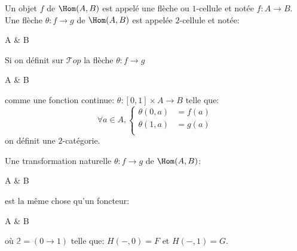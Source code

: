 \documentclass[math, info]{cours}
\begin{document}
\begin{definition}
\begin{enumerate}
	\end{enumerate}
	Un objet $f$ de $\Hom(A, B)$ est appelé une flèche ou $1$-cellule et notée $f: A\to B$.
	Une flèche $\theta : f\to g$ de $\Hom(A, B)$ est appelée $2$-cellule et notée:
	\begin{category}[]
		A\ar[r, "f" name=A, bend left]\ar[r, "g"' name=B, bend right] & B
	\end{category}
	\label{def:2categorie}
\end{definition}

\begin{exemple} Si on définit sur $\mathcal{T}op$ la flèche $\theta: f \to g$
	\begin{category}[]
		A\ar[r, "f" name=A, bend left]\ar[r, "g"' name=B, bend right] & B
	\end{category}
	comme une fonction continue: $\theta: \left[0, 1 \right]\times A \to B$ telle que:
	\begin{equation*}
		\forall a \in A, \begin{cases}
			\theta\left(0, a \right) & = f(a) \\
			\theta\left(1, a \right) & = g(a) \\
		\end{cases}
	\end{equation*}
	on définit une $2$-catégorie.
\end{exemple}

\begin{remarque}
	Une transformation naturelle $\theta : f\to g$ de $\Hom(A, B)$:
	\begin{category}[]
		A\ar[r, "f" name=A, bend left]\ar[r, "g"' name=B, bend right] & B
	\end{category}
	est la même chose qu'un foncteur:
	\begin{category}
		A \times {} \ar[r, "H"] & B
	\end{category}
	où $\mathds{2} = \left(0 \to 1\right)$ telle que: $H\left(-, 0 \right) = F$ et $H\left(-, 1 \right) = G$.
\end{remarque}
\end{document}

